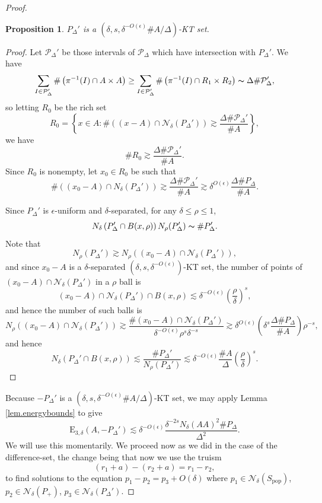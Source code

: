 \documentclass[12pt]{amsart}
\newtheorem{proposition}[theorem]{Proposition}
\newcommand{\1}{\mathbf{1}}
\begin{document}
\begin{proof}
\begin{proposition}\label{prop:pdeltaKT}
\(P_{\Delta} '\) is a \((\delta ,s , \delta^{-O (\epsilon)} \# A / \Delta)\)-KT set. 
\end{proposition}
\begin{proof}
Let \(\mathcal{P} _{\Delta} '\) be those intervals of \(\mathcal{P} _{\Delta} \) which have intersection
with \(P_{\Delta} '\). We have
\[
	\sum _{I \in \mathcal{P} _{\Delta} '}  \#  \left( \pi ^{-1} (I) \cap A \times A \right) \geq  \sum _{I \in \mathcal{P} _{\Delta} '} \#  \left( \pi ^{-1} (I) \cap R_1 \times R_2 \right) \thicksim \Delta \# \mathcal{P} _{\Delta} '
,\]
so letting \(R_0\) be the rich set
\[
	R_0 = \left\{ x \in A  : \# \left( (x - A) \cap \mathcal{N} _{\delta} (P_{\Delta} ') \right) \gtrsim \frac{\Delta \# \mathcal{P} _{\Delta} '}{\# A} \right\}  
,\]
we have
\[
	\# R_0 \gtrsim \frac{\Delta \# \mathcal{P} _{\Delta}' }{\# A}
.\]
Since \(R_0\) is nonempty, let \(x_0 \in R_0\) be such that
\[
	\# \left( (x_0-A)\cap N_{\delta} (P_{\Delta} ') \right) \gtrsim \frac{\Delta \# \mathcal{P} _{\Delta} '}{\# A } \gtrsim \delta^{O(\epsilon)}\frac{\Delta \# P_{\Delta} }{\# A}    
.\]

Since \(P_{\Delta} '\) is \(\epsilon\)-uniform and \(\delta\)-separated, for any \(\delta \leq \rho \leq 1\),
\[
	N_{\delta} \left( P_{\Delta} ' \cap B(x,\rho) \right) N_{\rho} (P_{\Delta} ') \thicksim \# P_{\Delta} '
.\]
Note that
\[
	N_{\rho} (P_{\Delta} ') \gtrsim  N_{\rho} \left( (x_0 - A)\cap \mathcal{N} _{\delta} (P_{\Delta} ') \right) 
,\]
and since \(x_0 - A\) is a \(\delta\)-separated \((\delta,s, \delta^{-O(\epsilon)})\)-KT set, the number of
points of \((x_0 - A)\cap \mathcal{N} _{\delta} (P_{\Delta} ') \) in a \(\rho\) ball is
\[
	(x_0 - A)\cap \mathcal{N} _{\delta} (P_{\Delta} ')\cap B(x,\rho)  \lesssim \delta^{-O(\epsilon)} \left( \frac{\rho}{\delta}  \right) ^{s}
,\]
and hence the number of such balls is 
\[
	N_{\rho} \left( (x_0 - A)\cap \mathcal{N} _{\delta} (P_{\Delta} ') \right) \gtrsim \frac{\# \left( x_0 - A \right) \cap \mathcal{N} _{\delta} (P_{\Delta} ')}{\delta^{-O(\epsilon)} \rho^{s} \delta^{-s}}    \gtrsim \delta^{O(\epsilon)} \left( \delta^{s} \frac{\Delta \# P_{\Delta} }{\# A}  \right) \rho ^{-s}
,\]
and hence
\[
	N_{\delta} \left( P_{\Delta} ' \cap B(x,\rho) \right) \lesssim \frac{\# P_{\Delta} '}{N_{\rho} (P_{\Delta} ')   } \lesssim \delta^{- O(\epsilon)} \frac{\# A}{\Delta}  \left( \frac{\rho}{\delta}  \right) ^{s}
.\] 
\end{proof}
Because \(- P_{\Delta} '\) is a \((\delta,s,\delta^{-O(\epsilon)} \# A / \Delta)\)-KT set, we may apply Lemma \ref{lem.energybounds} to give
\[
	\mathrm{E} _{3,\delta} (A,- P_{\Delta} ')\lesssim \delta^{-O(\epsilon)} \frac{\delta^{-2s} N_{\delta} (AA)^{2} \# P_{\Delta} }{\Delta^{2}} 
.\]
We will use this momentarily.
We proceed now as we did in the case of the difference-set, the change being that now we use the
truism
\[
	(r_1 + a) - (r_2 + a) = r_1 - r_2
,\]
to find solutions to the equation \(p_1 - p_2 = p_3 + O(\delta)\) where \(p_1 \in \mathcal{N} _{\delta} (S_{\text{pop}} ) \), \(p_2 \in \mathcal{N} _{\delta} (P_{+}) \), \(p_3 \in \mathcal{N} _{\delta} (P_{\Delta}' )\). 


\end{proof}
\end{document}
